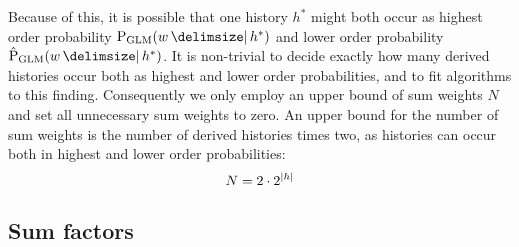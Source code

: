 Because of this, it is possible that one history $h^*$ might both occur as
highest order probability $\ProbGLM{w}{h^*}$ and lower order probability
$\ProbGLM*{w}{h^*}$.
It is non-trivial to decide exactly how many derived histories occur both as
highest and lower order probabilities, and to fit algorithms to this finding.
Consequently we only employ an upper bound of sum weights $N$ and set all
unnecessary sum weights to zero.
An upper bound for the number of sum weights is the number of derived histories
times two, as histories can occur both in highest and lower order probabilities:
\begin{equation}
  N = 2 \cdot 2^{\left|h\right|}
\end{equation}

\subsection{Sum factors}

